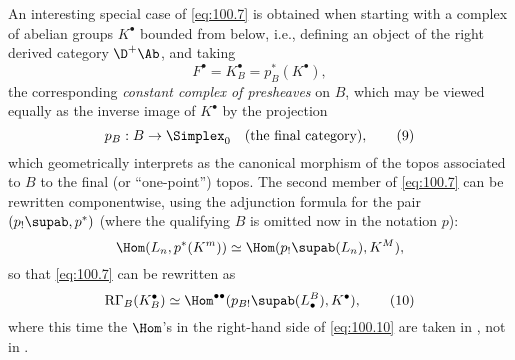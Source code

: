 An interesting special case of \eqref{eq:100.7} is obtained when
starting with a complex of abelian groups $K^\bullet$ bounded from
below, i.e., defining an object of the right derived category
$\D^+\Ab$, and taking
\begin{equation}
  \label{eq:100.8}
  F^\bullet=K_B^\bullet=p_B^*(K^\bullet),\tag{8}
\end{equation}
the corresponding \emph{constant complex of presheaves} on $B$, which
may be viewed equally as the inverse image of $K^\bullet$ by the
projection
\begin{equation}
  \label{eq:100.9}
  p_B:B\to\Simplex_0\quad(\text{the final category}),\tag{9}
\end{equation}
which geometrically interprets as the canonical morphism of the topos
associated to $B$ to the final (or ``one-point'') topos. The second
member of \eqref{eq:100.7} can be rewritten componentwise, using the
adjunction formula for the pair $(p_!\supab,p^*)$ (where the
qualifying $B$ is omitted now in the notation $p$):
\[\Hom(L_n,p^*(K^m))\simeq\Hom(p_!\supab(L_n),K^M),\]
so that \eqref{eq:100.7} can be rewritten as
\begin{equation}
  \label{eq:100.10}
  \mathrm R \Gamma_B(K_B^\bullet) \simeq
  \Hom^{\bullet\bullet}(p_{B!}\supab(L_\bullet^B),K^\bullet),\tag{10}
\end{equation}
where this time the $\Hom$'s in the right-hand side of
\eqref{eq:100.10} are taken in \Ab, not in \Bhatab.

